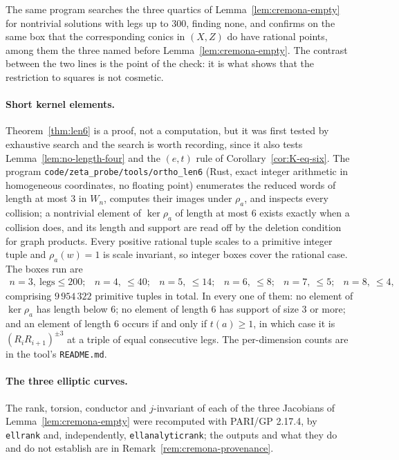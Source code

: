 \documentclass[11pt,a4paper]{article}
\theoremstyle{definition}
\theoremstyle{remark}
\theoremstyle{plain}
\begin{document}
The same program searches the three quartics of Lemma~\ref{lem:cremona-empty} for nontrivial
solutions with legs up to $300$, finding none, and confirms on the same box that the
corresponding conics in $(X,Z)$ do have rational points, among them the three named before
Lemma~\ref{lem:cremona-empty}. The contrast between the two lines is the point of the check: it
is what shows that the restriction to squares is not cosmetic.

\paragraph{Short kernel elements.}
Theorem~\ref{thm:len6} is a proof, not a computation, but it was first tested by exhaustive
search and the search is worth recording, since it also tests
Lemma~\ref{lem:no-length-four} and the $(e,t)$ rule of Corollary~\ref{cor:K-eq-six}. The
program \texttt{code/zeta\_probe/tools/ortho\_len6} (Rust, exact integer arithmetic in
homogeneous coordinates, no floating point) enumerates the reduced words of length at most $3$
in $W_n$, computes their images under $\rho_a$, and inspects every collision; a nontrivial
element of $\ker\rho_a$ of length at most $6$ exists exactly when a collision does, and its
length and support are read off by the deletion condition for graph products. Every positive
rational tuple scales to a primitive integer tuple and $\rho_a(w)=1$ is scale invariant, so
integer boxes cover the rational case. The boxes run are
\[
\begin{array}{llllll}
n=3,\ \text{legs}\le200; & n=4,\ \le40; & n=5,\ \le14; & n=6,\ \le8; & n=7,\ \le5;
  & n=8,\ \le4,
\end{array}
\]
comprising $9\,954\,322$ primitive tuples in total. In every one of them: no element of
$\ker\rho_a$ has length below $6$; no element of length $6$ has support of size $3$ or more;
and an element of length $6$ occurs if and only if $t(a)\ge1$, in which case it is
$(R_iR_{i+1})^{\pm3}$ at a triple of equal consecutive legs. The per-dimension counts are in
the tool's \texttt{README.md}.

\paragraph{The three elliptic curves.}
The rank, torsion, conductor and $j$-invariant of each of the three Jacobians of
Lemma~\ref{lem:cremona-empty} were recomputed with PARI/GP 2.17.4, by
\texttt{ellrank} and, independently, \texttt{ellanalyticrank}; the outputs and what they do and
do not establish are in Remark~\ref{rem:cremona-provenance}.
\end{document}
